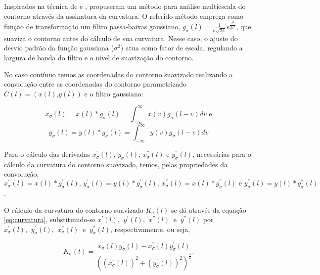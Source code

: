 Inspirados na técnica de  e ,  propuseram um método para análise multiescala do contorno através da assinatura da curvatura. O referido método emprega como função de transformação um filtro passa-baixas gaussiano, $g_{\sigma}(l) = \frac{1}{\sigma\sqrt{2\pi}}e^{\frac{l^2}{2\sigma^2}}$, que suaviza o contorno antes do cálculo de sua curvatura. Nesse caso, o ajuste do desvio padrão da função gaussiana ($\sigma^2$) atua como fator de escala, regulando a largura de banda do filtro e o nível de suavização do contorno.



No caso contínuo temos as coordenadas do contorno suavizado realizando a convolução entre as coordenadas do contorno parametrizado $C(l) = (x(l)\text{,}y(l))$ e o filtro gaussiano:  

\begin{equation}
x_{\sigma}(l) = x(l) * g_{\sigma}(l) = \int^{\infty}_{-\infty}{x(v)g_{\sigma}(l-v)}dv \text{ e}
\end{equation}
\begin{equation}
y_{\sigma}(l) = y(l) * g_{\sigma}(l)=\int^{\infty}_{-\infty}{y(v)g_{\sigma}(l-v)}dv
\end{equation}

Para o cálculo das derivadas $x^{'}_{\sigma}(l)\text{, }y^{'}_{\sigma}(l)\text{, }x^{''}_{\sigma}(l) \text{ e }y^{''}_{\sigma}(l)$, necessárias para o cálculo da curvatura do contorno suavizado, temos, pelas propriedades da convolução, $x^{'}_{\sigma}(l) = x(l) * g^{'}_{\sigma}(l)\text{, }y^{'}_{\sigma}(l) = y(l) * g^{'}_{\sigma}(l)\text{, }x^{''}_{\sigma}(l) = x(l) * g^{''}_{\sigma}(l)\text{ e }
y^{''}_{\sigma}(l) = y(l) * g^{''}_{\sigma}(l)$.

O cálculo da curvatura do contorno suavizado $K_{\sigma}(l)$ se dá através da equação \ref{eq:curvatura}, substituindo-se $x^{'}(l)\text{, }\:y^{'}(l)\text{, }\:x^{''}(l)\:\text{ e }\:y^{''}(l)$ por $x^{'}_{\sigma}(l)\text{, }\:y^{'}_{\sigma}(l)\text{, }\:x^{''}_{\sigma}(l)\:\text{ e }\:y^{''}_{\sigma}(l)$, respectivamente, ou seja,

\begin{equation} \label{eq:curvatura_ms}
K_{\sigma}(l) = \frac{x_{\sigma}^{'}(l)y_{\sigma}^{''}(l)-x_{\sigma}^{''}(l)y_{\sigma}^{'}(l)}{((x_{\sigma}^{''}(l))^{2}+(y_{\sigma}^{''}(l))^{2})^{\frac{3}{2}}}\text{.}
\end{equation}


